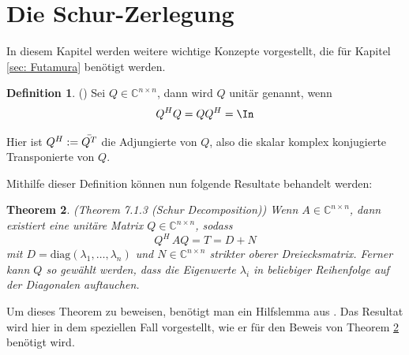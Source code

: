 \documentclass[a4paper,12pt]{report}
\newcommand{\C}{\mathbb C}
\newcommand{\diag}{\text{diag}}
\newcommand{\AlamB}{A-\lambda\,B}
\newcommand{\1}{\mathds{1}}
\theoremstyle{plain} %
\newtheorem{theorem}{Theorem}
\theoremstyle{definition} %
\newtheorem{definition}[theorem]{Definition}
\theoremstyle{remark}
\begin{document}
      \section{Die Schur-Zerlegung}
            In diesem Kapitel werden weitere wichtige Konzepte vorgestellt, die für Kapitel \ref{sec: Futamura} benötigt werden.

            \begin{definition}(\cite[S. 73]{matrixGolub})
                  Sei $Q \in\C^{n\times n}$, dann wird $Q$ unitär genannt, wenn
                  $$Q^HQ = QQ^H=\In$$
            \end{definition}

            Hier ist $Q^H := \Bar{Q^T}$ die Adjungierte von $Q$, also die skalar komplex konjugierte Transponierte von $Q$.

            Mithilfe dieser Definition können nun folgende Resultate behandelt werden:
            \begin{theorem}(Theorem 7.1.3 (Schur Decomposition)\cite[S. 313]{matrixGolub})
                  \label{thrm: Schur Zerlegung}
                  Wenn $A \in \C^{n\times n}$, dann existiert eine unitäre Matrix $Q\in\C^{n\times n}$, sodass
                  \begin{equation}
                        \label{eqn: Schur_Resultat}
                        Q^H\,AQ = T = D+N
                  \end{equation}
                  mit $D=\diag(\lambda_1,\dots,\lambda_n)$ und $N\in\C^{n\times n}$ strikter oberer Dreiecksmatrix.
                  Ferner kann $Q$ so gewählt werden, dass die Eigenwerte $\lambda_i$ in beliebiger Reihenfolge auf der Diagonalen auftauchen.
            \end{theorem}

            Um dieses Theorem zu beweisen, benötigt man ein Hilfslemma aus \cite[S.312]{matrixGolub}.
            Das Resultat wird hier in dem speziellen Fall vorgestellt, wie er für den Beweis von Theorem \ref{thrm: Schur Zerlegung} benötigt wird.
\end{document}
